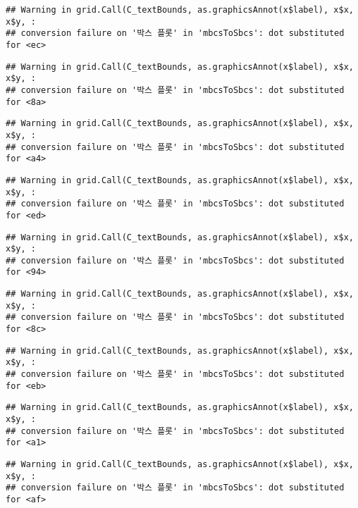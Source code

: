 \documentclass[
]{article}
\begin{document}
\begin{verbatim}
## Warning in grid.Call(C_textBounds, as.graphicsAnnot(x$label), x$x, x$y, :
## conversion failure on '박스 플롯' in 'mbcsToSbcs': dot substituted for <ec>
\end{verbatim}

\begin{verbatim}
## Warning in grid.Call(C_textBounds, as.graphicsAnnot(x$label), x$x, x$y, :
## conversion failure on '박스 플롯' in 'mbcsToSbcs': dot substituted for <8a>
\end{verbatim}

\begin{verbatim}
## Warning in grid.Call(C_textBounds, as.graphicsAnnot(x$label), x$x, x$y, :
## conversion failure on '박스 플롯' in 'mbcsToSbcs': dot substituted for <a4>
\end{verbatim}

\begin{verbatim}
## Warning in grid.Call(C_textBounds, as.graphicsAnnot(x$label), x$x, x$y, :
## conversion failure on '박스 플롯' in 'mbcsToSbcs': dot substituted for <ed>
\end{verbatim}

\begin{verbatim}
## Warning in grid.Call(C_textBounds, as.graphicsAnnot(x$label), x$x, x$y, :
## conversion failure on '박스 플롯' in 'mbcsToSbcs': dot substituted for <94>
\end{verbatim}

\begin{verbatim}
## Warning in grid.Call(C_textBounds, as.graphicsAnnot(x$label), x$x, x$y, :
## conversion failure on '박스 플롯' in 'mbcsToSbcs': dot substituted for <8c>
\end{verbatim}

\begin{verbatim}
## Warning in grid.Call(C_textBounds, as.graphicsAnnot(x$label), x$x, x$y, :
## conversion failure on '박스 플롯' in 'mbcsToSbcs': dot substituted for <eb>
\end{verbatim}

\begin{verbatim}
## Warning in grid.Call(C_textBounds, as.graphicsAnnot(x$label), x$x, x$y, :
## conversion failure on '박스 플롯' in 'mbcsToSbcs': dot substituted for <a1>
\end{verbatim}

\begin{verbatim}
## Warning in grid.Call(C_textBounds, as.graphicsAnnot(x$label), x$x, x$y, :
## conversion failure on '박스 플롯' in 'mbcsToSbcs': dot substituted for <af>
\end{verbatim}
\end{document}
